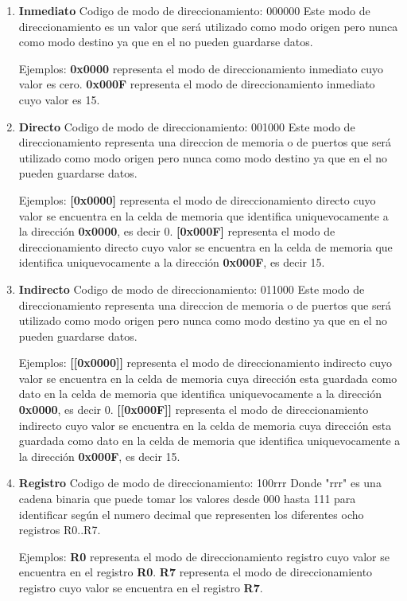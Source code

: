 \begin{enumerate}

\item \textbf{Inmediato}
Codigo de modo de direccionamiento: 000000
Este modo de direccionamiento es un valor que será utilizado como modo origen pero nunca como modo destino ya que en el no pueden guardarse datos.

Ejemplos:
\textbf{0x0000} representa el modo de direccionamiento inmediato cuyo valor es cero.
\textbf{0x000F} representa el modo de direccionamiento inmediato cuyo valor es 15.

\item \textbf{Directo}
Codigo de modo de direccionamiento: 001000
Este modo de direccionamiento representa una direccion de memoria o de puertos que será utilizado como modo origen pero nunca como modo destino ya que en el no pueden guardarse datos.

Ejemplos:
\textbf{[0x0000]} representa el modo de direccionamiento directo cuyo valor se encuentra en la celda de memoria que identifica uniquevocamente a la dirección \textbf{0x0000}, es decir 0.
\textbf{[0x000F]} representa el modo de direccionamiento directo cuyo valor se encuentra en la celda de memoria que identifica uniquevocamente a la dirección \textbf{0x000F}, es decir 15.

\item \textbf{Indirecto}
Codigo de modo de direccionamiento: 011000
Este modo de direccionamiento representa una direccion de memoria o de puertos que será utilizado como modo origen pero nunca como modo destino ya que en el no pueden guardarse datos.

Ejemplos:
\textbf{[[0x0000]]} representa el modo de direccionamiento indirecto cuyo valor se encuentra en la celda de memoria cuya dirección esta guardada como dato en la celda de memoria que identifica uniquevocamente a la dirección \textbf{0x0000}, es decir 0.
\textbf{[[0x000F]]} representa el modo de direccionamiento indirecto cuyo valor se encuentra en la celda de memoria cuya dirección esta guardada como dato en la celda de memoria que identifica uniquevocamente a la dirección \textbf{0x000F}, es decir 15.

\item \textbf{Registro}
Codigo de modo de direccionamiento: 100rrr 
Donde "rrr" es una cadena binaria que puede tomar los valores desde 000 hasta 111 para identificar según el numero decimal que representen los diferentes ocho registros R0..R7.

Ejemplos:
\textbf{R0} representa el modo de direccionamiento registro cuyo valor se encuentra en el registro \textbf{R0}.
\textbf{R7} representa el modo de direccionamiento registro cuyo valor se encuentra en el registro \textbf{R7}.


\end{enumerate}
